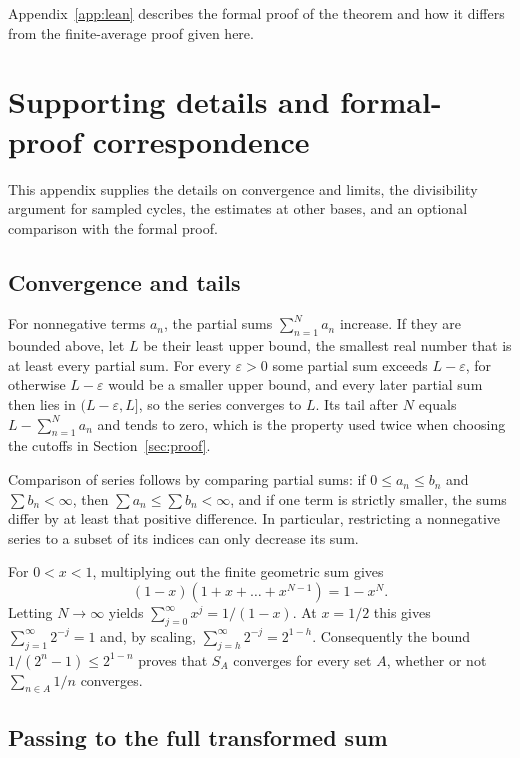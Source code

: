 \documentclass[10pt]{article}
\theoremstyle{plain}
\theoremstyle{definition}
\theoremstyle{remark}
\begin{document}
Appendix~\ref{app:lean} describes the formal proof of the theorem and
how it differs from the finite-average proof given here.

\appendix

\section{Supporting details and formal-proof correspondence}\label{app:full}

This appendix supplies the details on convergence and limits, the
divisibility argument for sampled cycles, the estimates at other bases,
and an optional comparison with the formal proof.

\subsection{Convergence and tails}\label{app:sums}

For nonnegative terms $a_n$, the partial sums
$\sum_{n=1}^{N}a_n$ increase. If they are bounded above, let $L$ be their
least upper bound, the smallest real number that is at least every
partial sum. For every $\varepsilon>0$ some partial sum exceeds
$L-\varepsilon$, for otherwise $L-\varepsilon$ would be a smaller upper
bound, and every later partial sum then lies in $(L-\varepsilon,L]$, so
the series converges to $L$. Its tail after $N$ equals
$L-\sum_{n=1}^{N}a_n$ and tends to zero, which is the property used
twice when choosing the cutoffs in Section~\ref{sec:proof}.

Comparison of series follows by comparing partial sums: if
$0\le a_n\le b_n$ and $\sum b_n<\infty$, then
$\sum a_n\le\sum b_n<\infty$, and if one term is strictly smaller, the
sums differ by at least that positive difference. In particular,
restricting a nonnegative series to a subset of its indices can only
decrease its sum.

For $0<x<1$, multiplying out the finite geometric sum gives
\[
 (1-x)(1+x+\dots+x^{N-1})=1-x^N.
\]
Letting $N\to\infty$ yields $\sum_{j=0}^{\infty}x^j=1/(1-x)$. At
$x=1/2$ this gives $\sum_{j=1}^{\infty}2^{-j}=1$ and, by scaling,
$\sum_{j=h}^{\infty}2^{-j}=2^{1-h}$. Consequently the bound
$1/(2^n-1)\le2^{1-n}$ proves that $S_A$ converges for every set $A$,
whether or not $\sum_{n\in A}1/n$ converges.

\subsection{Passing to the full transformed sum}\label{app:split}
\end{document}
